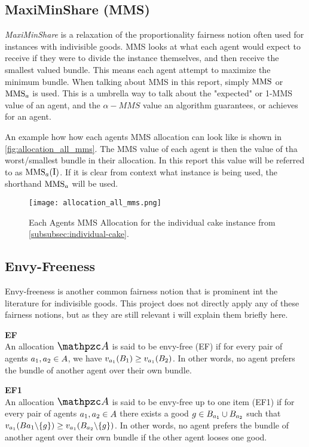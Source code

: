 \subsection*{MaxiMinShare (MMS)}
\emph{MaxiMinShare} is a relaxation of the proportionality fairness notion often used for instances with indivisible goods. MMS looks at what each agent would expect to receive if they were to divide the instance themselves, and then receive the smallest valued bundle. This means each agent attempt to maximize the minimum bundle. When talking about MMS in this report, simply $\text{MMS}$ or $\text{MMS}_a$ is used. This is a umbrella way to talk about the "expected" or 1-MMS value of an agent, and the $\alpha-MMS$ value an algorithm guarantees, or achieves for an agent. 

An example how how each agents MMS allocation can look like is shown in \autoref{fig:allocation_all_mms}. The MMS value of each agent is then the value of tha worst/smallest bundle in their allocation.  
In this report this value will be referred to as $\MMS_\sAgent(\sInstance)$. If it is clear from context what instance is being used, the shorthand $\text{MMS}_a$ will be used.
\begin{figure}
    \centering
    \texttt{[image: allocation\_all\_mms.png]}
    \caption{Each Agents MMS Allocation for the individual cake instance from \autoref{subsubsec:individual-cake}.}
    \label{fig:allocation_all_mms}
\end{figure}



\subsection*{Envy-Freeness}
Envy-freeness is another common fairness notion that is prominent int the literature for indivisible goods. This project does not directly apply any of these fairness notions, but as they are still relevant i will explain them briefly here.  

\textbf{EF}\\
An allocation $\sAllocation$ is said to be envy-free (EF) if for every pair of agents $a_1,a_2 \in A$, we have $v_{a_1}(B_1) \geq v_{a_1}(B_2)$. In other words, no agent prefers the bundle of another agent over their own bundle.

\textbf{EF1}\\
An allocation $\sAllocation$ is said to be envy-free up to one item (EF1) if for every pair of agents $a_1,a_2 \in A$ there exists a good $g \in B_{a_1} \cup B_{a_2}$ such that $v_{a_1}(B{a_1} \backslash \{g\}) \geq v_{a_1}(B_{a_2} \backslash \{g\})$. In other words, no agent prefers the bundle of another agent over their own bundle if the other agent looses one good.

